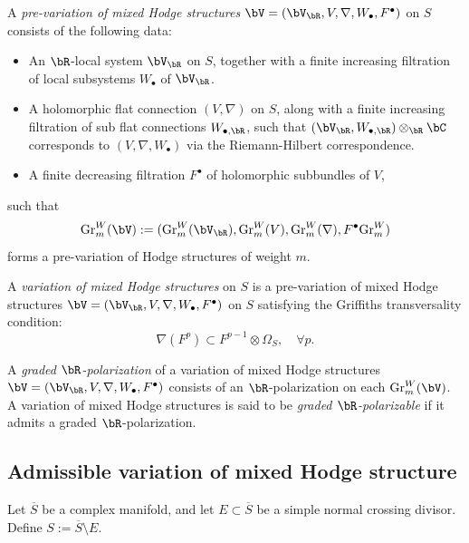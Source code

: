 \documentclass[11pt,letterpaper]{amsart}
\numberwithin{equation}{section}
\begin{document}
\begin{defn}  
	A \emph{pre-variation of mixed Hodge structures} $\bV = (\bV_{\bR}, V, \nabla, W_\bullet, F^\bullet)$ on $S$ consists of the following data:  
	\begin{itemize}  
		\item An $\bR$-local system $\bV_{\bR}$ on $S$, together with a finite increasing filtration of local subsystems $W_\bullet$ of $\bV_{\bR}$.  
		\item A holomorphic flat connection $(V, \nabla)$ on $S$, along with a finite increasing filtration of sub flat connections $W_{\bullet,\bR}$, such that $(\bV_{\bR}, W_{\bullet,\bR}) \otimes_{\bR} \bC$ corresponds to $(V, \nabla, W_\bullet)$ via the Riemann-Hilbert correspondence.  
		\item A finite decreasing filtration $F^\bullet$ of holomorphic subbundles of $V$,  
	\end{itemize}  
	such that  
	$$
	{\rm Gr}^W_m(\bV) := ({\rm Gr}^W_m(\bV_{\bR}), {\rm Gr}^W_m(V), {\rm Gr}^W_m(\nabla), F^\bullet {\rm Gr}^W_m)
	$$  
	forms a pre-variation of Hodge structures of weight $m$.  
	
	A \emph{variation of mixed Hodge structures} on $S$ is a pre-variation of mixed Hodge structures $\bV = (\bV_{\bR}, V, \nabla, W_\bullet, F^\bullet)$ on $S$ satisfying the Griffiths transversality condition:  
	$$
	\nabla(F^p) \subset F^{p-1} \otimes \Omega_S, \quad \forall p.
	$$  
	
	A \emph{graded $\bR$-polarization} of a variation of mixed Hodge structures $\bV = (\bV_{\bR}, V, \nabla, W_\bullet, F^\bullet)$ consists of an $\bR$-polarization on each ${\rm Gr}^W_m(\bV)$. A variation of mixed Hodge structures is said to be \emph{graded $\bR$-polarizable} if it admits a graded $\bR$-polarization.  
\end{defn}  
\subsection{Admissible variation of mixed Hodge structure}
Let $\overline{S}$ be a complex manifold, and let $E \subset \overline{S}$ be a simple normal crossing divisor. Define $S := \overline{S} \setminus E$. 
\end{document}
